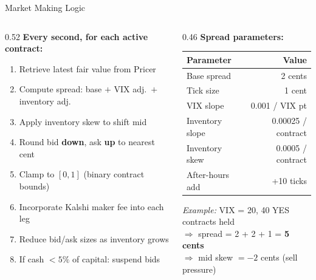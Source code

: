 \documentclass[aspectratio=169]{beamer}
\begin{document}
\begin{frame}{Market Making Logic}
  \begin{columns}[T,onlytextwidth]
    \begin{column}{0.52\textwidth}
      \textbf{Every second, for each active contract:}
      \begin{enumerate}\small
        \item Retrieve latest fair value from Pricer
        \item Compute spread: base $+$ VIX adj.\ $+$ inventory adj.
        \item Apply inventory skew to shift mid
        \item Round bid \textbf{down}, ask \textbf{up} to nearest cent
        \item Clamp to $[0, 1]$ (binary contract bounds)
        \item Incorporate Kalshi maker fee into each leg
        \item Reduce bid/ask sizes as inventory grows
        \item If cash $<5\%$ of capital: suspend bids
      \end{enumerate}
    \end{column}
    \begin{column}{0.46\textwidth}
      \textbf{Spread parameters:}
      \vspace{0.2em}
      \begin{tabular}{@{}lr@{}}
        \toprule
        Parameter & Value \\
        \midrule
        Base spread      & 2 cents \\
        Tick size        & 1 cent \\
        VIX slope        & 0.001 / VIX pt \\
        Inventory slope  & 0.00025 / contract \\
        Inventory skew   & 0.0005 / contract \\
        After-hours add  & +10 ticks \\
        \bottomrule
      \end{tabular}
      \vspace{0.4em}
      \small
      \textit{Example:} VIX = 20, 40 YES contracts held\\
      $\Rightarrow$ spread = 2 + 2 + 1 = \textbf{5 cents}\\
      $\Rightarrow$ mid skew $= -2$ cents (sell pressure)
    \end{column}
  \end{columns}
\end{frame}
\end{document}
